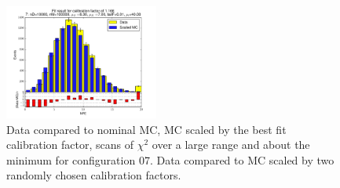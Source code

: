 \begin{figure}[htbp]
\begin{center}
\includegraphics[width=0.45\textwidth]{../FIGURES/07/FIG_Fit_result_for_calibration_factor_of_1_166.pdf} 
\caption{Data compared to nominal MC, MC scaled by the best fit calibration factor, scans of $\chi^2$ over a large range and about the minimum for configuration 07. Data compared to MC scaled by two randomly chosen calibration factors.} 
\label{tab:best_07} 
\end{center} \end{figure} 

